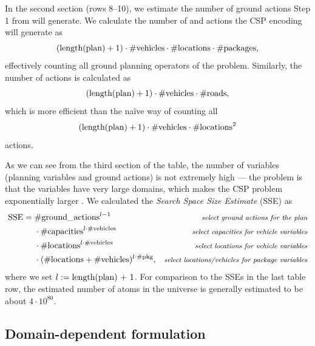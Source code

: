 In the second section (rows 8--10), we estimate the number of ground actions
Step 1 from \citet[Section~8.3.1]{Ghallab2004} will generate.
We calculate the number of \pickup{} and \drop{} actions the CSP encoding will generate
as $$(\textrm{length(plan)} + 1) \cdot \textrm{\#vehicles} \cdot \textrm{\#locations} \cdot \textrm{\#packages},$$
effectively counting all ground planning operators of the problem. Similarly,
the number of \drive{} actions is calculated as
$$(\textrm{length(plan)} + 1) \cdot \textrm{\#vehicles} \cdot \textrm{\#roads},$$
which is more efficient than the na{\"{i}}ve way of
counting all
$$(\textrm{length(plan)} + 1) \cdot \textrm{\#vehicles} \cdot \textrm{\#locations}^2$$
actions.

As we can see from the third section of the table, the number of variables
(planning variables and ground actions) is not extremely high
--- the problem is that the variables have very large domains,
which makes the CSP problem exponentially larger \citep[Section~8.3.2]{Ghallab2004}.
We calculated the \textit{Search Space Size Estimate} (SSE) as
\begin{align*}
\textrm{SSE} =\; &\textrm{\#ground\_actions}^{l-1} & \textit{\footnotesize select ground actions for the plan}\\
&\cdot \textrm{\#capacities}^{l \cdot \textrm{\#vehicles}} & \textit{\footnotesize select capacities for vehicle variables}\\
&\cdot \textrm{\#locations}^{l \cdot \textrm{\#vehicles}} & \textit{\footnotesize select locations for vehicle variables}\\
&\cdot (\textrm{\#locations} + \textrm{\#vehicles})^{l \cdot \textrm{\#pkg}}, & \textit{\footnotesize select locations/vehicles for package variables}
\end{align*}
where we set $l := \textrm{length(plan) + 1}$.
For comparison to the SSEs in the last table row, 
the estimated number of atoms in the universe is generally estimated to be about $4 \cdot 10^{80}$.

\subsection{Domain-dependent formulation}\label{csp-custom-repr}




